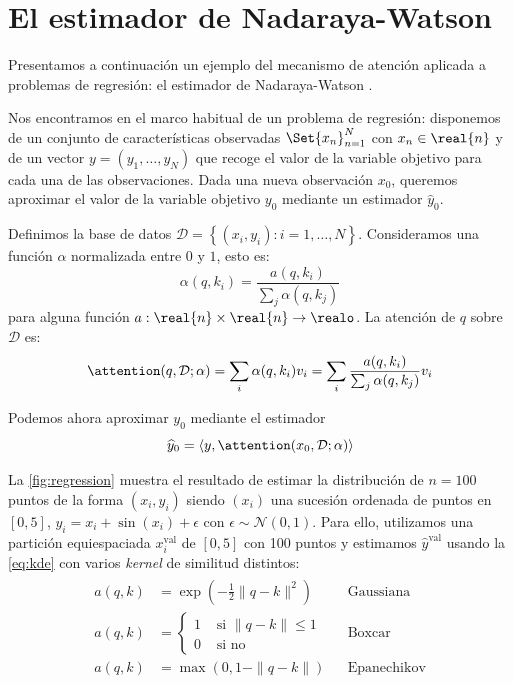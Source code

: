 \chapter{El estimador de Nadaraya-Watson}
Presentamos a continuación un ejemplo del mecanismo de atención aplicada a problemas de regresión: el estimador de Nadaraya-Watson \cite{watson1964smooth, nadaraya1964estimating}.

Nos encontramos en el marco habitual de un problema de regresión: disponemos de un conjunto de características observadas \( \Set{x_{n}}_{n = 1}^N \) con \( x_{n}  \in \real{n} \) y de un vector \( y = (y_1, \dots, y_N) \) que recoge el valor de la variable objetivo para cada una de las observaciones. Dada una nueva observación \( x_{0} \), queremos aproximar el valor de la variable objetivo \( y_{0} \) mediante un estimador \( \widehat{y}_{0} \).

Definimos la base de datos \( \mathcal{D} = \left\{ (x_{i}, y_{i}) : i = 1, \dots, N \right\} \). Consideramos una función \( \alpha \) normalizada entre \( 0 \) y \( 1 \), esto es:
\[
    \alpha(q, k_{i}) = \frac{a(q, k_{i})}{\sum_j \alpha(q, k_{j}) }
\]
para alguna función \( a : \real{n} \times \real{n} \to \realo \). La atención de \( q \) sobre \( \mathcal{D} \) es:
\[
    \attention(q, \mathcal{D}; \alpha) = \sum_i  \alpha(q, k_{i}) v_{i} = \sum_i \frac{a(q, k_{i})}{\sum_j \alpha(q, k_{j})} v_{i}
\]

Podemos ahora aproximar \( y_{0} \) mediante el estimador 
\begin{equation}\label{eq:kde}
    \widehat{y}_{0} = \left\langle y, \attention(x_{0}, \mathcal{D}; \alpha) \right\rangle
\end{equation}

La \cref{fig:regression} muestra el resultado de estimar la distribución de \( n = 100 \) puntos de la forma \( (x_{i}, y_{i}) \) siendo \( (x_{i}) \) una sucesión ordenada de puntos en \( [0, 5] \), \( y_{i} = x_{i} + \sin(x_{i}) + \epsilon \) con \( \epsilon \sim \mathcal{N}(0, 1) \). Para ello, utilizamos una partición equiespaciada \( x^\text{val}_{i} \) de \( [0, 5] \) con 100 puntos y estimamos \( \widehat{y}^\text{val} \) usando la \cref{eq:kde} con varios \textit{kernel} de similitud distintos:
\[
    \begin{split}\begin{aligned}
    a(q, k) & = \exp\left(-\frac{1}{2} \|q - k\|^2 \right) && \mathrm{Gaussiana} \\
    a(q, k) & = \begin{cases}
        1 &\text{ si } \|q - k\| \leq 1 \\
        0 &\text{ si no}
    \end{cases} && \mathrm{Boxcar}
    \\
    a(q, k) & = \max\left(0, 1 - \|q - k\|\right) && \mathrm{Epanechikov}
    \end{aligned}\end{split}
\]

